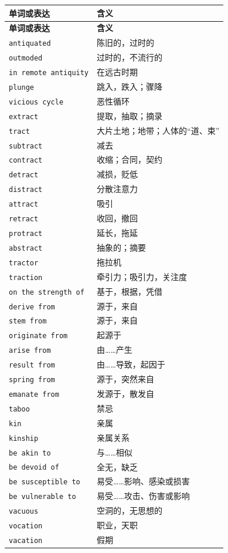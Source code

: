 \documentclass[UTF8,zihao=-4]{ctexart}
\begin{document}
\begin{longtable}{>{\raggedright\arraybackslash}p{4.8cm} >{\raggedright\arraybackslash}p{9.7cm}}
\toprule
\textbf{单词或表达} & \textbf{含义} \\
\midrule
\endfirsthead
\toprule
\textbf{单词或表达} & \textbf{含义} \\
\midrule
\endhead
\texttt{antiquated} & 陈旧的，过时的 \\
\texttt{outmoded} & 过时的，不流行的 \\
\texttt{in remote antiquity} & 在远古时期 \\
\texttt{plunge} & 跳入，跌入；骤降 \\
\texttt{vicious cycle} & 恶性循环 \\
\texttt{extract} & 提取，抽取；摘录 \\
\texttt{tract} & 大片土地；地带；人体的“道、束” \\
\texttt{subtract} & 减去 \\
\texttt{contract} & 收缩；合同，契约 \\
\texttt{detract} & 减损，贬低 \\
\texttt{distract} & 分散注意力 \\
\texttt{attract} & 吸引 \\
\texttt{retract} & 收回，撤回 \\
\texttt{protract} & 延长，拖延 \\
\texttt{abstract} & 抽象的；摘要 \\
\texttt{tractor} & 拖拉机 \\
\texttt{traction} & 牵引力；吸引力，关注度 \\
\texttt{on the strength of} & 基于，根据，凭借 \\
\texttt{derive from} & 源于，来自 \\
\texttt{stem from} & 源于，来自 \\
\texttt{originate from} & 起源于 \\
\texttt{arise from} & 由……产生 \\
\texttt{result from} & 由……导致，起因于 \\
\texttt{spring from} & 源于，突然来自 \\
\texttt{emanate from} & 发源于，散发自 \\
\texttt{taboo} & 禁忌 \\
\texttt{kin} & 亲属 \\
\texttt{kinship} & 亲属关系 \\
\texttt{be akin to} & 与……相似 \\
\texttt{be devoid of} & 全无，缺乏 \\
\texttt{be susceptible to} & 易受……影响、感染或损害 \\
\texttt{be vulnerable to} & 易受……攻击、伤害或影响 \\
\texttt{vacuous} & 空洞的，无思想的 \\
\texttt{vocation} & 职业，天职 \\
\texttt{vacation} & 假期 \\
\bottomrule
\end{longtable}
\end{document}
